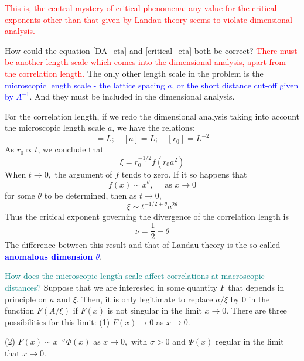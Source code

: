 \documentclass[12pt,titlepage]{article}
\newcommand{\redp}[1]{\textcolor{red}{#1}}
\newcommand{\bluep}[1]{\textcolor{blue}{#1}}
\newcommand{\tealp}[1]{\textcolor{teal}{#1}}
\numberwithin{equation}{section}
\begin{document}
\redp{This is, the central mystery of critical phenomena: any value for the critical exponents other than that given by Landau theory seems to violate dimensional analysis.}

How could the equation \ref{DA_eta} and \ref{critical_eta} both be correct?\redp{ There must be another length scale which comes into the dimensional analysis, apart from the correlation length.} The only other length scale
in the problem is the \bluep{microscopic length scale - the lattice spacing $a$, or the short distance cut-off given by $\Lambda^{-1}$}. And they must be included in the dimensional analysis.

For the correlation length, if we redo the dimensional analysis taking into account the microscopic length scale $a$, we have the relations:
\begin{equation}
[\xi]=L ; \quad[a]=L ; \quad\left[r_{0}\right]=L^{-2}
\end{equation}
As $r_0\propto t$, we conclude that
\begin{equation}
\xi=r_{0}^{-1 / 2} f\left(r_{0} a^{2}\right)
\end{equation}
When $t \rightarrow 0,$ the argument of $f$ tends to zero. If it so happens that
\begin{equation}
f(x) \sim x^{\theta}, \quad \text { as } x \rightarrow 0
\end{equation}
for some $\theta$ to be determined, then as $t\rightarrow 0$,
\begin{equation}
\xi \sim t^{-1 / 2+\theta} a^{2 \theta}
\end{equation}
Thus the critical exponent governing the divergence of the correlation length is
\begin{equation}
\nu=\frac{1}{2}-\theta
\end{equation}
The difference between this result and that of Landau theory is the so-called \textbf{\bluep{anomalous dimension $\theta$}}.

\tealp{How does the microscopic length scale affect correlations at macroscopic distances?} Suppose that we are
interested in some quantity $F$ that depends in principle on $a$ and $\xi$. Then, it is only legitimate to replace $a/\xi$ by 0 in the function $F(A/\xi)$ if $F(x)$ is not singular in the limit $x\rightarrow 0$. There are three possibilities for this limit:
(1) $F(x) \rightarrow 0$ as $x \rightarrow 0 .$

(2) $F(x) \sim x^{-\sigma} \Phi(x)$ as $x \rightarrow 0,$ with $\sigma>0$ and $\Phi(x)$ regular in the limit that $x \rightarrow 0 .$
\end{document}

